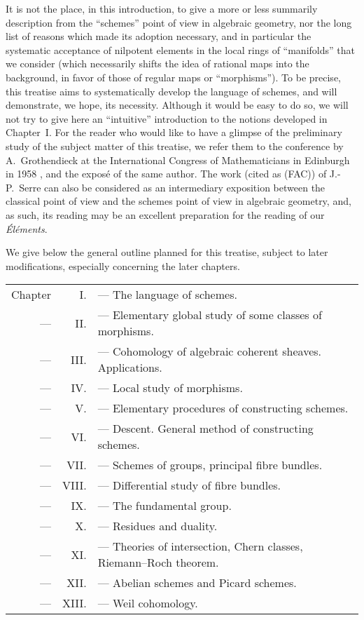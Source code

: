\sectionbreak

It is not the place, in this introduction, to give a more or less summarily description from the ``schemes'' point of view in algebraic geometry, nor the long list of reasons which made its adoption necessary, and in particular the systematic acceptance of nilpotent elements in the local rings of ``manifolds'' that we consider (which necessarily shifts the idea of rational maps into the background, in favor of those of regular maps or ``morphisms'').
To be precise, this treatise aims to systematically develop the language of schemes, and will demonstrate, we hope, its necessity.
Although it would be easy to do so,
we will not try to give here an ``intuitive'' introduction to the notions developed in Chapter~I.
For the reader who would like to have a glimpse of the preliminary study of the subject matter of this treatise, we refer them to the conference by A.~Grothendieck at the International Congress of Mathematicians in Edinburgh in 1958 \cite{I-7}, and the expos\'e \cite{I-8} of the same author.
The work \cite{I-14} (cited as (FAC)) of J.-P.~Serre can also be considered as an intermediary exposition between the classical point of view and the schemes point of view in algebraic geometry, and, as such, its reading may be an excellent preparation for the reading of our \emph{\'El\'ements}.

\sectionbreak

We give below the general outline planned for this treatise, subject to later modifications, especially concerning the later chapters.

\begin{tabular}{rrl}
Chapter & I. & --- The language of schemes.\\
--- & II. & --- Elementary global study of some classes of morphisms.\\
--- & III. & --- Cohomology of algebraic coherent sheaves. Applications.\\
--- & IV. & --- Local study of morphisms.\\
--- & V. & --- Elementary procedures of constructing schemes.\\
--- & VI. & --- Descent. General method of constructing schemes.\\
--- & VII. & --- Schemes of groups, principal fibre bundles.\\
--- & VIII. & --- Differential study of fibre bundles.\\
--- & IX. & --- The fundamental group.\\
--- & X. & --- Residues and duality.\\
--- & XI. & --- Theories of intersection, Chern classes,
Riemann--Roch theorem.\\
--- & XII. & --- Abelian schemes and Picard schemes.\\
--- & XIII. & --- Weil cohomology.
\end{tabular}\\

